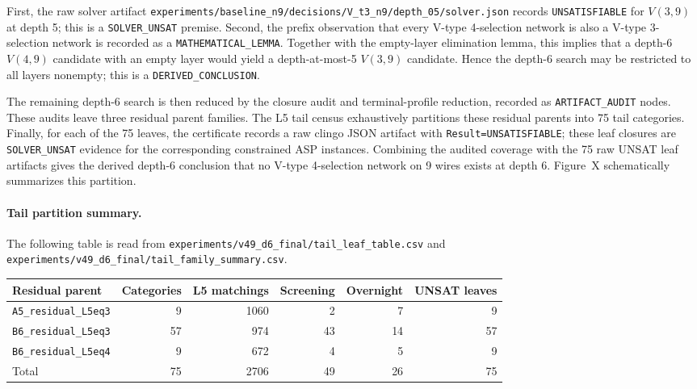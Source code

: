 First, the raw solver artifact
\texttt{experiments/baseline\_n9/decisions/V\_t3\_n9/depth\_05/solver.json}
records \texttt{UNSATISFIABLE} for \(V(3,9)\) at depth 5; this is a
\texttt{SOLVER\_UNSAT} premise. Second, the prefix observation that every
V-type 4-selection network is also a V-type 3-selection network is recorded as
a \texttt{MATHEMATICAL\_LEMMA}. Together with the empty-layer elimination
lemma, this implies that a depth-6 \(V(4,9)\) candidate with an empty layer
would yield a depth-at-most-5 \(V(3,9)\) candidate. Hence the depth-6 search may
be restricted to all layers nonempty; this is a \texttt{DERIVED\_CONCLUSION}.

The remaining depth-6 search is then reduced by the closure audit and
terminal-profile reduction, recorded as \texttt{ARTIFACT\_AUDIT} nodes. These
audits leave three residual parent families. The L5 tail census exhaustively
partitions these residual parents into 75 tail categories. Finally, for each of
the 75 leaves, the certificate records a raw clingo JSON artifact with
\texttt{Result=UNSATISFIABLE}; these leaf closures are \texttt{SOLVER\_UNSAT}
evidence for the corresponding constrained ASP instances. Combining the
audited coverage with the 75 raw UNSAT leaf artifacts gives the derived
depth-6 conclusion that no V-type 4-selection network on 9 wires exists at
depth 6. Figure~X schematically summarizes this partition.

\paragraph{Tail partition summary.}
The following table is read from
\texttt{experiments/v49\_d6\_final/tail\_leaf\_table.csv} and
\texttt{experiments/v49\_d6\_final/tail\_family\_summary.csv}.

\begin{center}
\begin{tabular}{lrrrrr}
\hline
Residual parent & Categories & L5 matchings & Screening & Overnight & UNSAT leaves \\
\hline
\texttt{A5\_residual\_L5eq3} & 9 & 1060 & 2 & 7 & 9 \\
\texttt{B6\_residual\_L5eq3} & 57 & 974 & 43 & 14 & 57 \\
\texttt{B6\_residual\_L5eq4} & 9 & 672 & 4 & 5 & 9 \\
\hline
Total & 75 & 2706 & 49 & 26 & 75 \\
\hline
\end{tabular}
\end{center}


